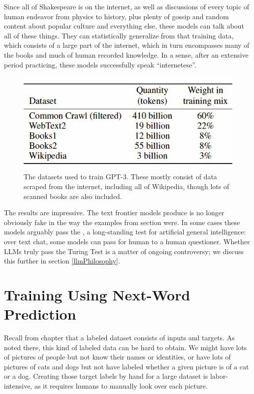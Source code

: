 Since all of Shakespeare is on the internet, as well as discussions of every
topic of human endeavor from physics to history, plus plenty of gossip and
random content about popular culture and everything else, these models can talk
about all of these things. They can statistically generalize from that training
data, which consists of a large part of the internet, which in turn encompasses
many of the books and much of human recorded knowledge. In a sense, after an
extensive period practicing, these models successfully speak ``internetese''.

\begin{figure}[ht]
\centering
\includegraphics[scale=.4]{./images/gptDatasets}
\caption[From \cite{brown2020language}.]{The datasets used to train GPT-3.
These mostly consist of data scraped from the internet, including all of
Wikipedia, though lots of scanned books are also included.}
\label{gptDatasets}
\end{figure}

The results are impressive. The text frontier models produce is no longer
obviously fake in the way the examples from section
 were. In some cases these models arguably pass
the , a long-standing test for artificial general
intelligence: over text chat, some models can pass for human to a human
questioner. Whether LLMs truly pass the Turing Test is a matter of ongoing
controversy; we discuss this further in section \ref{llmPhilosophy}.

\section{Training Using Next-Word Prediction}

Recall from chapter  that a labeled dataset consists of
inputs and targets. As noted there, this kind of labeled data can be hard to
obtain. We might have lots of pictures of people but not know their names or
identities, or have lots of pictures of cats and dogs but not have labeled
whether a given picture is of a cat or a dog. Creating those target labels by
hand for a large dataset is labor-intensive, as it requires humans to manually
look over each picture.

